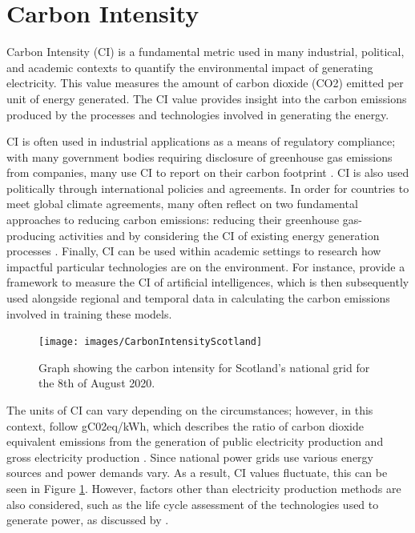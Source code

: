 \documentclass{l4proj}
\begin{document}
\section{Carbon Intensity}

Carbon Intensity (CI) is a fundamental metric used in many industrial, political, and academic contexts to quantify the environmental impact of generating electricity.
This value measures the amount of carbon dioxide (CO2) emitted per unit of energy generated.
The CI value provides insight into the carbon emissions produced by the processes and technologies involved in generating the energy.

CI is often used in industrial applications as a means of regulatory compliance; with many government bodies requiring disclosure of greenhouse gas emissions from companies, many use CI to report on their carbon footprint \citep{industry_ci}.
CI is also used politically through international policies and agreements.
In order for countries to meet global climate agreements, many often reflect on two fundamental approaches to reducing carbon emissions: reducing their greenhouse gas-producing activities and by considering the CI of existing energy generation processes \cite{political_ci}.
Finally, CI can be used within academic settings to research how impactful particular technologies are on the environment.
For instance, \cite{academic_ci} provide a framework to measure the CI of artificial intelligences, which is then subsequently used alongside regional and temporal data in calculating the carbon emissions involved in training these models.

\begin{figure}[h]
    \centering
    \texttt{[image: images/CarbonIntensityScotland]}
    ~
    \caption{Graph showing the carbon intensity for Scotland's national grid for the 8th of August 2020.}
    \label{fig:carbonIntensityScotland}
\end{figure}

The units of CI can vary depending on the circumstances; however, in this context, follow gC02eq/kWh, which describes the ratio of carbon dioxide equivalent emissions from the generation of public electricity production and gross electricity production \citep{EEA_CO2_emission_intensity}.
Since national power grids use various energy sources and power demands vary.
As a result, CI values fluctuate, this can be seen in Figure \ref{fig:carbonIntensityScotland}.
However, factors other than electricity production methods are also considered, such as the life cycle assessment of the technologies used to generate power, as discussed by \cite{PEHNT200655}.
\end{document}
